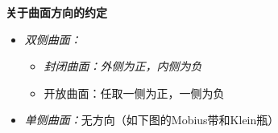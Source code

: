 \begin{shaded}
	{\bf 关于曲面方向的约定}
	\begin{itemize}
	  \setlength{\itemindent}{1cm}
	  \item {\it 双侧曲面：}
	  \begin{itemize}
	    \setlength{\itemindent}{1cm}
	    \item {\it 封闭曲面：外侧为正，内侧为负}
	    \item 开放曲面：任取一侧为正，一侧为负
	  \end{itemize}
	  \item {\it 单侧曲面：}无方向（如下图的Mobius带和Klein瓶）
	\end{itemize}
	\begin{center}
		\quad\quad\quad
	\end{center}	
\end{shaded}

